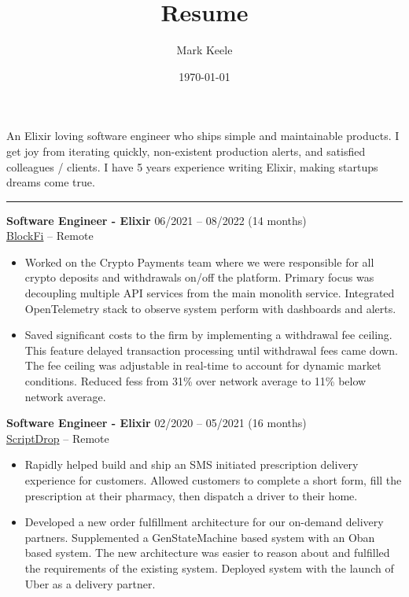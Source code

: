 \documentclass[12pt,letterpaper]{article}
\author{Mark Keele}
\title{Resume}
\date{\today}
\begin{document}
An Elixir loving software engineer who ships simple and maintainable products. I get joy from iterating quickly, non-existent production alerts, and satisfied colleagues / clients. I have 5 years experience writing Elixir, making startups dreams come true.

\noindent\rule{7.5in}{0.4pt}

\noindent\textbf{Software Engineer - Elixir}
\hfill{06/2021 -- 08/2022 (14 months)} \\
\href{https://blockfi.com/}{BlockFi} -- Remote

\begin{itemize}

  \item Worked on the Crypto Payments team where we were responsible for all crypto deposits and withdrawals on/off the platform. Primary focus was decoupling multiple API services from the main monolith service. Integrated OpenTelemetry stack to observe system perform with dashboards and alerts.

  \item Saved significant costs to the firm by implementing a withdrawal fee ceiling. This feature delayed transaction processing until withdrawal fees came down. The fee ceiling was adjustable in real-time to account for dynamic market conditions. Reduced fess from 31\% over network average to 11\% below network average.

\end{itemize}

\noindent\textbf{Software Engineer - Elixir}
\hfill{02/2020 -- 05/2021 (16 months)} \\
\href{https://scriptdrop.co/}{ScriptDrop} -- Remote

\begin{itemize}

  \item Rapidly helped build and ship an SMS initiated prescription delivery experience for customers. Allowed customers to complete a short form, fill the prescription at their pharmacy, then dispatch a driver to their home.

  \item Developed a new order fulfillment architecture for our on-demand delivery partners. Supplemented a GenStateMachine based system with an Oban based system. The new architecture was easier to reason about and fulfilled the requirements of the existing system. Deployed system with the launch of Uber as a delivery partner.

\end{itemize}
\end{document}
